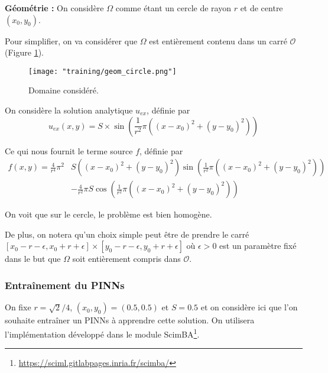 \textbf{Géométrie :} On considère $\Omega$ comme étant un cercle de rayon $r$ et de centre $(x_0,y_0)$. 

Pour simplifier, on va considérer que $\Omega$ est entièrement contenu dans un carré $\mathcal{O}$ (Figure \ref{geom_circle}). 

\begin{minipage}{0.38\linewidth}
	\begin{figure}[H]
		\centering
		\texttt{[image: "training/geom\_circle.png"]}
		\caption{Domaine considéré.}
		\label{geom_circle}
	\end{figure}
\end{minipage}
\begin{minipage}{0.68\linewidth}
	On considère la solution analytique $u_{ex}$, définie par
	\begin{equation*}
		u_{ex}(x,y)=S\times\sin\left(\frac{1}{r^2}\pi((x-x_0)^2+(y-y_0)^2)\right)
	\end{equation*}
	
	Ce qui nous fournit le terme source $f$, définie par
	\begin{align*}
		f(x,y)=\frac{4}{r^4}\pi^2&S((x-x_0)^2+(y-y_0)^2)\sin\left(\frac{1}{r^2}\pi((x-x_0)^2+(y-y_0)^2)\right) \\
		&-\frac{4}{r^2}\pi S \cos\left(\frac{1}{r^2}\pi((x-x_0)^2+(y-y_0)^2)\right)
	\end{align*}
\end{minipage}
\begin{Rem}
	On voit que sur le cercle, le problème est bien homogène.
	
	De plus, on notera qu'un choix simple peut être de prendre le carré $[x_0-r-\epsilon,x_0+r+\epsilon]\times[y_0-r-\epsilon,y_0+r+\epsilon]$ où $\epsilon>0$ est un paramètre fixé dans le but que $\Omega$ soit entièrement compris dans $\mathcal{O}$.
\end{Rem}

\subsubsection{Entraînement du PINNs}

On fixe $r=\sqrt{2}/4$, $(x_0,y_0)=(0.5,0.5)$ et $S=0.5$ et on considère ici que l'on souhaite entraîner un PINNs à apprendre cette solution. On utilisera l'implémentation développé dans le module ScimBA\footnote{\url{https://sciml.gitlabpages.inria.fr/scimba/}}. 

